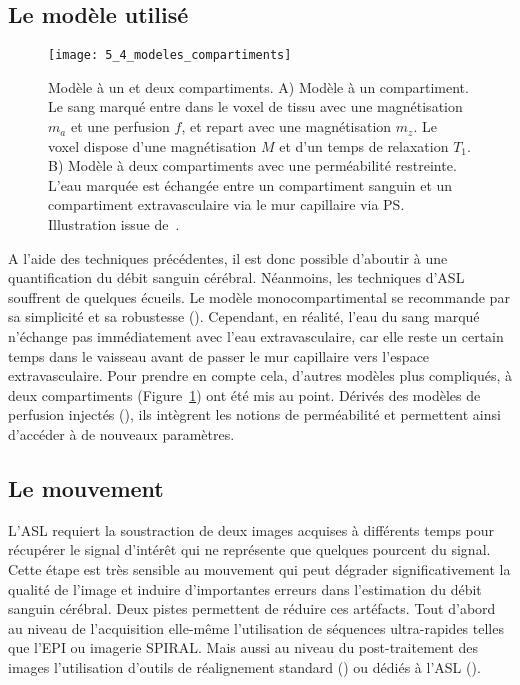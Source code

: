 \subsection{Le modèle utilisé}
\begin{figure}[!t]
\centering
\texttt{[image: 5\_4\_modeles\_compartiments]}
\caption{Modèle à un et deux compartiments. A) Modèle à un compartiment. Le sang marqué entre dans le voxel de tissu
avec une magnétisation $m_a$ et une perfusion $f$, et repart avec une magnétisation $m_z$. Le voxel dispose d’une magnétisation
$M$ et d’un temps de relaxation $T_1$. B) Modèle à deux compartiments avec une perméabilité restreinte. L’eau marquée est
échangée entre un compartiment sanguin et un compartiment extravasculaire via le mur capillaire via PS. Illustration issue
de~\cite{Parkes2005}.}
\label{fig:5_4_modeles_compartiments}	
\end{figure}
A l’aide des techniques précédentes, il est donc possible d’aboutir à une quantification du débit
sanguin cérébral. Néanmoins, les techniques d’ASL souffrent de quelques écueils. Le modèle
monocompartimental se recommande par sa simplicité et sa robustesse (\cite{Alsop2014}). Cependant, en réalité,
l’eau du sang marqué n’échange pas immédiatement avec l’eau extravasculaire, car elle reste un
certain temps dans le vaisseau avant de passer le mur capillaire vers l’espace extravasculaire. Pour
prendre en compte cela, d’autres modèles plus compliqués, à deux compartiments (Figure~\ref{fig:5_4_modeles_compartiments}) ont
été mis au point. Dérivés des modèles de perfusion injectés (\cite{Parkes2005}), ils intègrent les notions de
perméabilité et permettent ainsi d’accéder à de nouveaux paramètres.

\subsection{Le mouvement}
L’ASL requiert la soustraction de deux images acquises à différents temps pour récupérer le
signal d’intérêt qui ne représente que quelques pourcent du signal. Cette étape est très sensible au
mouvement qui peut dégrader significativement la qualité de l’image et induire d’importantes erreurs
dans l’estimation du débit sanguin cérébral. Deux pistes permettent de réduire ces artéfacts. Tout
d’abord au niveau de l’acquisition elle-même l’utilisation de séquences ultra-rapides telles que l’EPI ou
imagerie SPIRAL. Mais aussi au niveau du post-traitement des images l’utilisation d’outils de
réalignement standard (\cite{Friston2006}) ou dédiés à l’ASL (\cite{Wang2012}).
